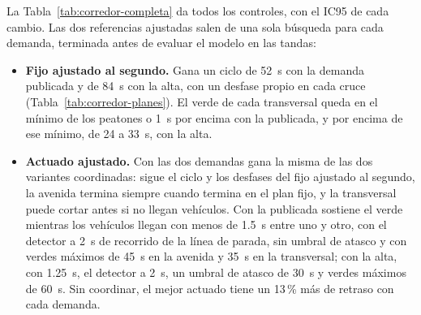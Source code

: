 La Tabla~\ref{tab:corredor-completa} da todos los controles, con el
IC95 de cada cambio. Las dos referencias ajustadas salen de una sola
búsqueda para cada demanda, terminada antes de evaluar el modelo en las
tandas:
\begin{itemize}
  \item \textbf{Fijo ajustado al segundo.} Gana un ciclo de 52~s con la
    demanda publicada y de 84~s con la alta, con un desfase propio en
    cada cruce (Tabla~\ref{tab:corredor-planes}). El verde de cada
    transversal queda en el mínimo de los peatones o 1~s por encima con
    la publicada, y por encima de ese mínimo, de 24 a 33~s, con la alta.
  \item \textbf{Actuado ajustado.} Con las dos demandas gana la misma de
    las dos variantes coordinadas: sigue el ciclo y los desfases del
    fijo ajustado al segundo, la avenida termina siempre cuando termina
    en el plan fijo, y la transversal puede cortar antes si no llegan
    vehículos. Con la publicada sostiene el verde mientras los vehículos
    llegan con menos de 1.5~s entre uno y otro, con el detector a 2~s de
    recorrido de la línea de parada, sin umbral de atasco y con verdes
    máximos de 45~s en la avenida y 35~s en la transversal; con la alta,
    con 1.25~s, el detector a 2~s, un umbral de atasco de 30~s y verdes
    máximos de 60~s. Sin coordinar, el mejor actuado tiene un 13\,\% más
    de retraso con cada demanda.
\end{itemize}

